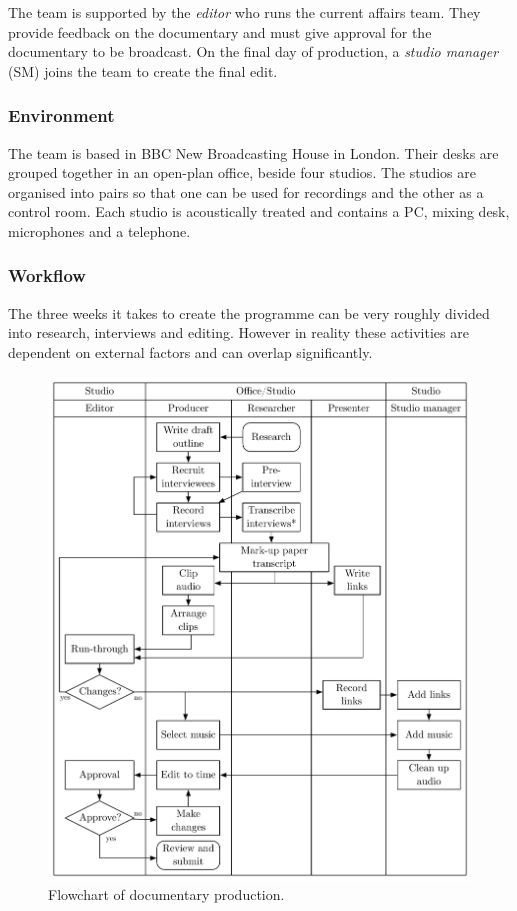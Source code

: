 The team is supported by the \textit{editor} who runs the current affairs team.  They provide feedback on the
documentary and must give approval for the documentary to be broadcast. On the final day of production, a
\textit{studio manager} (SM) joins the team to create the final edit.

\subsubsection{Environment}
The team is based in BBC New Broadcasting House in London. Their desks are grouped together in an open-plan office,
beside four studios. The studios are organised into pairs so that one can be used for recordings and the other as a
control room. Each studio is acoustically treated and contains a PC, mixing desk, microphones and a telephone.

\subsubsection{Workflow}
The three weeks it takes to create the programme can be very roughly divided into research, interviews and editing.
However in reality these activities are dependent on external factors and can overlap significantly.


\begin{figure}[ht]
  \centering
  \includegraphics[width=4.5in]{figs/docs-workflow.pdf}
  \caption{Flowchart of documentary production.}
  \label{fig:ethno-drama-recording}
\end{figure}

